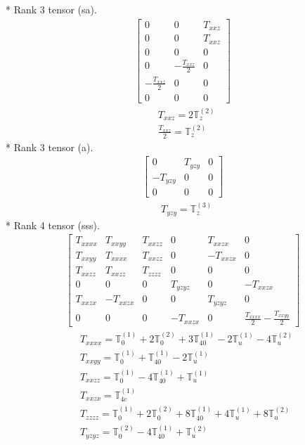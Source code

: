 \documentclass[fleqn,8pt,landscape]{jsarticle}
\begin{document}
* Rank 3 tensor (sa).
\begin{align*}
\begin{bmatrix} 0 & 0 & T_{xxz} \\ 0 & 0 & T_{xxz} \\ 0 & 0 & 0 \\ 0 & - \frac{T_{xxz}}{2} & 0 \\ - \frac{T_{xxz}}{2} & 0 & 0 \\ 0 & 0 & 0 \end{bmatrix}
\end{align*}
\begin{align*}
& T_{xxz} = 2 \mathbb{T}_{z}^{(2)} \\
& \frac{T_{xxz}}{2} = \mathbb{T}_{z}^{(2)}
\end{align*}
* Rank 3 tensor (a).
\begin{align*}
\begin{bmatrix} 0 & T_{yzy} & 0 \\ - T_{yzy} & 0 & 0 \\ 0 & 0 & 0 \end{bmatrix}
\end{align*}
\begin{align*}
& T_{yzy} = \mathbb{T}_{z}^{(3)}
\end{align*}
* Rank 4 tensor (sss).
\begin{align*}
\begin{bmatrix} T_{xxxx} & T_{xxyy} & T_{xxzz} & 0 & T_{xxzx} & 0 \\ T_{xxyy} & T_{xxxx} & T_{xxzz} & 0 & - T_{xxzx} & 0 \\ T_{xxzz} & T_{xxzz} & T_{zzzz} & 0 & 0 & 0 \\ 0 & 0 & 0 & T_{yzyz} & 0 & - T_{xxzx} \\ T_{xxzx} & - T_{xxzx} & 0 & 0 & T_{yzyz} & 0 \\ 0 & 0 & 0 & - T_{xxzx} & 0 & \frac{T_{xxxx}}{2} - \frac{T_{xxyy}}{2} \end{bmatrix}
\end{align*}
\begin{align*}
& T_{xxxx} = \mathbb{T}_{0}^{(1)} + 2 \mathbb{T}_{0}^{(2)} + 3 \mathbb{T}_{40}^{(1)} - 2 \mathbb{T}_{u}^{(1)} - 4 \mathbb{T}_{u}^{(2)} \\
& T_{xxyy} = \mathbb{T}_{0}^{(1)} + \mathbb{T}_{40}^{(1)} - 2 \mathbb{T}_{u}^{(1)} \\
& T_{xxzz} = \mathbb{T}_{0}^{(1)} - 4 \mathbb{T}_{40}^{(1)} + \mathbb{T}_{u}^{(1)} \\
& T_{xxzx} = \mathbb{T}_{4c}^{(1)} \\
& T_{zzzz} = \mathbb{T}_{0}^{(1)} + 2 \mathbb{T}_{0}^{(2)} + 8 \mathbb{T}_{40}^{(1)} + 4 \mathbb{T}_{u}^{(1)} + 8 \mathbb{T}_{u}^{(2)} \\
& T_{yzyz} = \mathbb{T}_{0}^{(2)} - 4 \mathbb{T}_{40}^{(1)} + \mathbb{T}_{u}^{(2)}
\end{align*}
\end{document}
